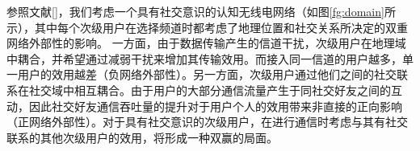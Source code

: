 参照文献[]，我们考虑一个具有社交意识的认知无线电网络（如图\ref{fg:domain}所示），其中每个次级用户在选择频道时都考虑了地理位置和社交关系所决定的双重网络外部性的影响。
一方面，由于数据传输产生的信道干扰，次级用户在地理域中耦合，并希望通过减弱干扰来增加其传输效用。而接入同一信道的用户越多，单一用户的效用越差（负网络外部性）。另一方面，次级用户通过他们之间的社交联系在社交域中相互耦合。由于用户的大部分通信流量产生于同社交好友之间的互动，因此社交好友通信吞吐量的提升对于用户个人的效用带来非直接的正向影响（正网络外部性）。对于具有社交意识的次级用户，在进行通信时考虑与其有社交联系的其他次级用户的效用，将形成一种双赢的局面。

